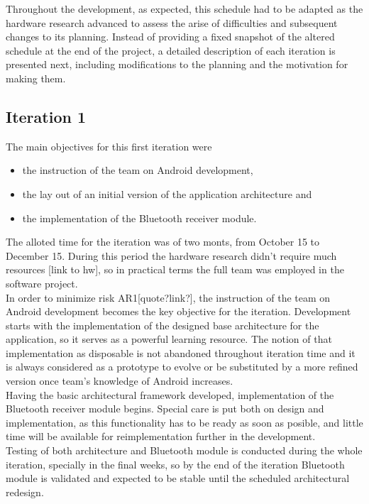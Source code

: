 			Throughout the development, as expected, this schedule had to be adapted as the hardware research advanced to assess the arise of difficulties and subsequent changes to its planning. Instead of providing a fixed snapshot of the altered schedule at the end of the project, a detailed description of each iteration is presented next, including modifications to the planning and the motivation for making them.

		\subsection{Iteration 1}

			The main objectives for this first iteration were
			\begin{itemize} 
				\item the instruction of the team on Android development, 
				\item the lay out of an initial version of the application architecture and
				\item the implementation of the Bluetooth receiver module.
			\end{itemize}

			The alloted time for the iteration was of two monts, from October 15 to December 15. During this period the hardware research didn't require much resources [link to hw], so in practical terms the full team was employed in the software project.\\

			In order to minimize risk AR1[quote?link?], the instruction of the team on Android development becomes the key objective for the iteration. Development starts with the implementation of the designed base architecture for the application, so it serves as a powerful learning resource. The notion of that implementation as disposable is not abandoned throughout iteration time and it is always considered as a prototype to evolve or be substituted by a more refined version once team's knowledge of Android increases.\\

			Having the basic architectural framework developed, implementation of the Bluetooth receiver module begins. Special care is put both on design and implementation, as this functionality has to be ready as soon as posible, and little time will be available for reimplementation further in the development.\\

			Testing of both architecture and Bluetooth module is conducted during the whole iteration, specially in the final weeks, so by the end of the iteration Bluetooth module is validated and expected to be stable until the scheduled architectural redesign.\\

